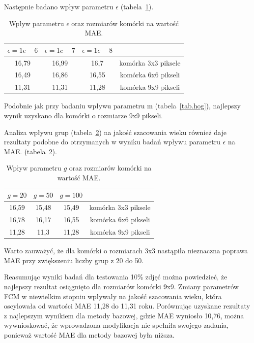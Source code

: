 \documentclass[a4paper,twoside,12pt]{book}
\begin{document}
    Następnie badano wpływ parametru $\epsilon$ (tabela~\ref{tab.hog1}).
    \begin{table}[]
        \centering
        \caption{Wpływ parametru $\epsilon$ oraz rozmiarów komórki na wartość MAE.}
        \begin{tabular}{|c|c|c|c|}
            \hline
            $\epsilon=1e-6$ &  $\epsilon=1e-7$ &  $\epsilon=1e-8$ &                     \\ \hline
            16,79 & 16,99 & 16,7 & komórka 3x3 piksele \\ \hline
            16,49 & 16,86 & 16,55 & komórka 6x6 pikseli \\ \hline
            11,31 & 11,31 & 11,28 & komórka 9x9 pikseli \\ \hline
        \end{tabular}
        \label{tab.hog1}
    \end{table}

    Podobnie jak przy badaniu wpływu parametru m (tabela~\ref{tab.hog}), najlepszy wynik uzyskano dla komórki o
    rozmiarze 9x9 pikseli.

    Analiza wpływu grup (tabela~\ref{tab.hog2}) na jakość szacowania wieku również daje rezultaty podobne do otrzymanych
    w wyniku badań wpływu parametru $\epsilon$ na MAE.
    (tabela~\ref{tab.hog2}).
    \begin{table}[]
        \centering
        \caption{Wpływ parametru $g$ oraz rozmiarów komórki na wartość MAE.}
        \begin{tabular}{|c|c|c|c|}
            \hline
            $g=20$ & $g=50$ & $g=100$ &                     \\ \hline
            16,59 & 15,48 & 15,49 & komórka 3x3 piksele \\ \hline
            16,78 & 16,17 & 16,55 & komórka 6x6 pikseli \\ \hline
            11,28 & 11,3 & 11,28 & komórka 9x9 pikseli \\ \hline
        \end{tabular}
        \label{tab.hog2}
    \end{table}

    Warto zauważyć, że dla komórki o rozmiarach 3x3 nastąpiła nieznaczna poprawa MAE przy zwiększeniu liczby grup z
    20 do 50.

    Reasumując wyniki badań dla testowania 10\% zdjęć można powiedzieć, że najlepszy rezultat osiągnięto dla
    rozmiarów komórki 9x9. Zmiany parametrów FCM w niewielkim stopniu wpływały na jakość szacowania wieku, która
    oscylowała
    od wartości MAE 11,28 do 11,31 roku.
    Porównując uzyskane rezultaty z najlepszym wynikiem dla metody bazowej, gdzie MAE wyniosło 10,76, można
    wywnioskować, że wprowadzona modyfikacja nie spełniła swojego zadania, ponieważ wartość MAE
    dla metody bazowej była niższa.
\end{document}

